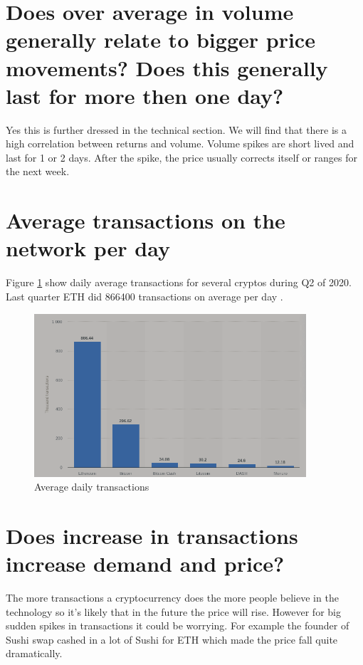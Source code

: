\section{Does over average in volume generally relate to bigger price movements? Does this generally last for more then one day?}
Yes this is further dressed in the technical section. We will find that there is a high correlation between returns and volume. Volume spikes are short lived and last for 1 or 2 days.  After the spike, the price usually corrects itself or  ranges for the next week.
\section{Average transactions on the network per day}

Figure \ref{fig:trans} \cite{tr} show daily average transactions for several cryptos during Q2 of 2020. Last quarter ETH did 866400 transactions on average per day  .


\begin{figure}[H]
\center
\includegraphics[width=0.9\textwidth]{fig/trans.png}
\caption{Average daily transactions}
\label{fig:trans}
\end{figure}

\section{Does increase in transactions increase demand and price?}

The more transactions a cryptocurrency does the more people believe in the technology so it's likely that in the future the price will rise.  However for big sudden spikes in transactions it could be worrying.  For example the founder of Sushi swap cashed in a lot of Sushi for ETH which made the price fall quite dramatically.